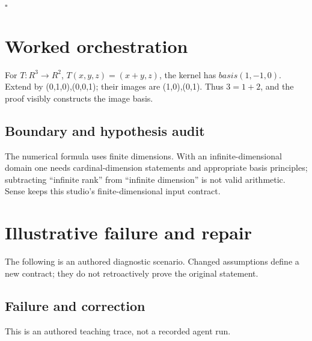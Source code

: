 \documentclass[preprint,12pt,aps,pra,showkeys,amsmath,amssymb,superscriptaddress,floatfix]{revtex4-2}
\theoremstyle{definition}
\theoremstyle{remark}
\begin{document}
\hfill$\square$

\section{Worked orchestration}

For \(T:R^{3}\to R^{2}\), \(T(x,y,z)=(x+y,z)\), the kernel has
\(basis(1,-1,0)\). Extend by (0,1,0),(0,0,1); their images are
(1,0),(0,1). Thus \(3=1+2\), and the proof visibly constructs the image
basis.

\subsection{Boundary and hypothesis audit}

The numerical formula uses finite dimensions. With an
infinite-dimensional domain one needs cardinal-dimension statements and
appropriate basis principles; subtracting ``infinite rank'' from
``infinite dimension'' is not valid arithmetic. Sense keeps this
studio's finite-dimensional input contract.

\section{Illustrative failure and repair}

The following is an authored diagnostic scenario. Changed assumptions
define a new contract; they do not retroactively prove the original
statement.

\subsection{Failure and correction}
This is an authored teaching trace, not a recorded agent run.
\end{document}
